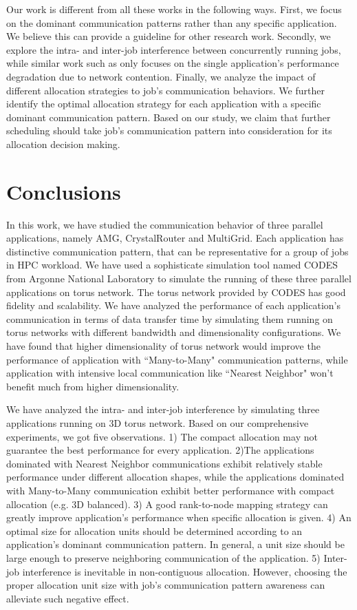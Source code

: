 \documentclass[conference]{IEEEtran}
\begin{document}
Our work is different from all these works in the following ways. First, we focus on the dominant communication patterns rather than any specific application. We believe this can provide a guideline for other research work. Secondly, we explore the intra- and inter-job interference between concurrently running jobs, while similar work such as \cite{abhinav-sc13} only focuses on the single application's performance degradation due to network contention. Finally, we analyze the impact of different allocation strategies to job's communication behaviors. We further identify the optimal allocation strategy for each application with a specific dominant communication pattern. Based on our study, we claim that further scheduling should take job's communication pattern into consideration for its allocation decision making. 

\section{Conclusions}
\label{sec:conclusion}
In this work, we have studied the communication behavior of three parallel applications, namely AMG, CrystalRouter and MultiGrid. Each application has distinctive communication pattern, that can be representative for a group of jobs in HPC workload. We have used a sophisticate simulation tool named CODES from Argonne National Laboratory to simulate the running of these three parallel applications on torus network. The torus network provided by CODES has good fidelity and scalability. We have analyzed the performance of each application's communication in terms of data transfer time by simulating them running on torus networks with different bandwidth and dimensionality configurations. We have found that higher dimensionality of torus network would improve the performance of application with ``Many-to-Many" communication patterns, while application with intensive local communication like ``Nearest Neighbor" won't benefit much from higher dimensionality.

We have analyzed the intra- and inter-job interference by simulating three applications running on 3D torus network. Based on our comprehensive experiments, we got five observations. 1) The compact allocation may not guarantee the best performance for every application. 2)The applications dominated with Nearest Neighbor communications exhibit relatively stable performance under different allocation shapes, while the applications dominated with Many-to-Many communication exhibit better performance with compact allocation (e.g. 3D balanced). 3) A good rank-to-node mapping strategy can greatly improve application's performance when specific allocation is given. 4) An optimal size for allocation units should be determined according to an application's dominant communication pattern. In general, a unit size should be large enough to preserve neighboring communication of the application. 5) Inter-job interference is inevitable in non-contiguous allocation. However, choosing the proper allocation unit size with job's communication pattern awareness can alleviate such negative effect.
\end{document}
